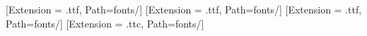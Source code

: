 \newCJKfontfamily{}[Extension = .ttf, Path=fonts/]
\newCJKfontfamily{}[Extension = .ttf, Path=fonts/]
\newCJKfontfamily{}[Extension = .ttf, Path=fonts/]
\newCJKfontfamily{}[Extension = .ttc, Path=fonts/]

\newcommand{\song}{\simsun}     %
\newcommand{\fs}{\simfang}      %
\newcommand{\kai}{\simkai}      %
\newcommand{\hei}{\simhei}      %
\newcommand{\chuhao}{\fontsize{42pt}{\baselineskip}\selectfont}           %
\newcommand{\xiaochuhao}{\fontsize{36pt}{\baselineskip}\selectfont}       %
\newcommand{\yihao}{\fontsize{28pt}{\baselineskip}\selectfont}            %
\newcommand{\erhao}{\fontsize{22pt}{\baselineskip}\selectfont}            %
\newcommand{\xiaoerhao}{\fontsize{18pt}{\baselineskip}\selectfont}        %
\newcommand{\sanhao}{\fontsize{15.75pt}{\baselineskip}\selectfont}        %
\newcommand{\sihao}{\fontsize{14pt}{\baselineskip}\selectfont}            %
\newcommand{\xiaosihao}{\fontsize{12pt}{14pt}\selectfont}                 %
\newcommand{\wuhao}{\fontsize{10.5pt}{12.6pt}\selectfont}                 %
\newcommand{\xiaowuhao}{\fontsize{9pt}{11pt}{\baselineskip}\selectfont}   %
\newcommand{\liuhao}{\fontsize{7.875pt}{\baselineskip}\selectfont}        %
\newcommand{\qihao}{\fontsize{5.25pt}{\baselineskip}\selectfont}          %

\makeatletter


\renewcommand{\chaptername}{第~\@arabic\c@chapter~章}
\renewcommand{\@makechapterhead}[1]{%
   \vspace*{-\baselineskip}%
   {\normalfont \flushleft\Large\bfseries%
   \chaptername \quad #1 \par\nobreak%
   \vspace{1.5\baselineskip}
   }}
\renewcommand{\@makeschapterhead}[1]{%
   \vspace*{-\baselineskip}%
   {\normalfont \flushleft\Large\bfseries #1 \par\nobreak%
   \vspace{1.5\baselineskip}
   }}

